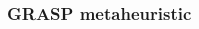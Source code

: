 \documentclass[10pt,xcolor=dvipsnames]{beamer}
\begin{document}
%
%
\begin{frame}
  \frametitle{GRASP metaheuristic}
\vspace{3mm}


\begin{columns}
\begin{column}{0.295\textwidth}
\centering
  

\end{column}
\end{columns}
\end{frame}
\end{document}
